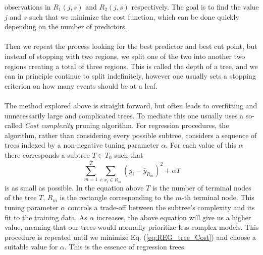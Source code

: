 \documentclass[12pt, a4paper]{book}
\begin{document}
observations in $R_1(j,s)$ and $R_2(j,s)$ respectively. The goal is to find the value $j$ and $s$ such that we minimize the cost function, which can be done quickly depending on the number of predictors.\\
\\Then we repeat the process looking for the best predictor and best cut point, but instead of stopping with two regions, we split one of the two into another two regions creating a total of three regions. This is called the depth of a tree, and we can in principle continue to split indefinitely, 
however one usually sets a stopping criterion on how many events should be at a leaf.\\
\\The method explored above is straight forward, but often leads to overfitting and unnecessarily large and complicated trees. To mediate this one usually uses a so-called \textit{Cost complexity} pruning algorithm. 
For regression procedures, the algorithm, rather than considering every possible subtree, considers a sequence of trees indexed by a non-negative tuning parameter $\alpha$. For each value of this $\alpha$ there corresponds a subtree $T\in T_0$ such that
\begin{equation}\label{eq:REG_tree_Cost}
    \sum_{m=1}^{\bar{T}}\sum_{i:x_i\in R_m}(y_i -\bar{y}_{R_m})^2 + \alpha T
\end{equation}
is as small as possible. In the equation above $T$ is the number of terminal nodes of the tree $T$, $R_m$ is the rectangle corresponding to the $m$-th terminal node. This tuning parameter $\alpha$ controls a trade-off between the subtree's complexity and its fit to the training data. 
As $\alpha$ increases, the above equation will give us a higher value, meaning that our trees would normally prioritize less complex models. This procedure is repeated until we minimize Eq. (\ref{eq:REG_tree_Cost}) and choose a suitable value for $\alpha$. This is the essence of regression trees.
\end{document}
